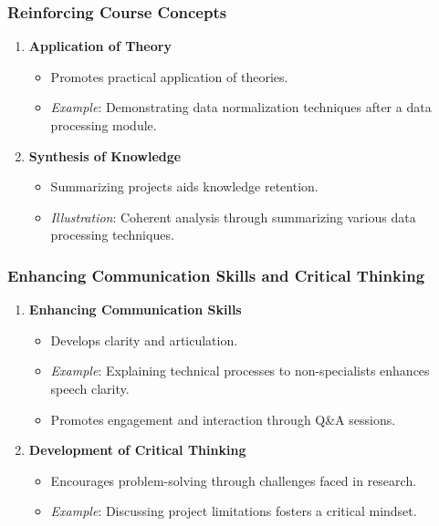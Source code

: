\documentclass[aspectratio=169]{beamer}
\begin{document}
\begin{frame}[fragile]
    \frametitle{Reinforcing Course Concepts}
    \begin{enumerate}
        \item \textbf{Application of Theory}
            \begin{itemize}
                \item Promotes practical application of theories.
                \item \textit{Example}: Demonstrating data normalization techniques after a data processing module.
            \end{itemize}
        \item \textbf{Synthesis of Knowledge}
            \begin{itemize}
                \item Summarizing projects aids knowledge retention.
                \item \textit{Illustration}: Coherent analysis through summarizing various data processing techniques.
            \end{itemize}
    \end{enumerate}
\end{frame}

\begin{frame}[fragile]
    \frametitle{Enhancing Communication Skills and Critical Thinking}
    \begin{enumerate}
        \item \textbf{Enhancing Communication Skills}
            \begin{itemize}
                \item Develops clarity and articulation.
                \item \textit{Example}: Explaining technical processes to non-specialists enhances speech clarity.
                \item Promotes engagement and interaction through Q\&A sessions.
            \end{itemize}
        \item \textbf{Development of Critical Thinking}
            \begin{itemize}
                \item Encourages problem-solving through challenges faced in research.
                \item \textit{Example}: Discussing project limitations fosters a critical mindset.
            \end{itemize}
    \end{enumerate}
\end{frame}
\end{document}
